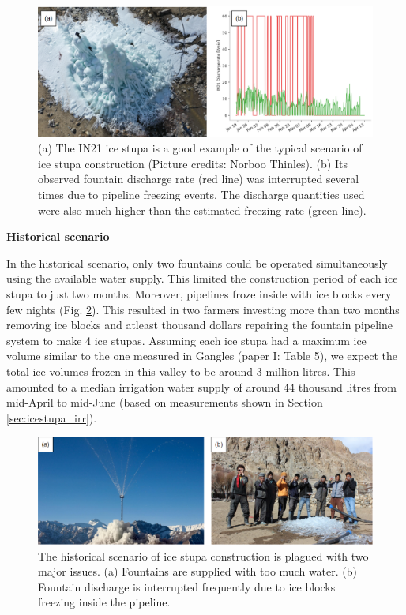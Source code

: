 \begin{figure}[htb]
	\includegraphics[width=\textwidth]{figs/gangles_data}

  \caption{(a) The IN21 ice stupa is a good example of the typical scenario of ice stupa construction (Picture
  credits: Norboo Thinles). (b) Its observed fountain discharge rate (red line) was interrupted several times
  due to pipeline freezing events. The discharge quantities used were also much higher than the estimated
  freezing rate (green line). }

	\label{fig:gangles_data}
\end{figure}

\textbf{Historical scenario}

In the historical scenario, only two fountains could be operated simultaneously using the available water
supply. This limited the construction period of each ice stupa to just two months. Moreover, pipelines froze
inside with ice blocks every few nights (Fig. \ref{fig:issues}). This resulted in two farmers investing more
than two months removing ice blocks and atleast thousand dollars repairing the fountain pipeline system to make
4 ice stupas. Assuming each ice stupa had a maximum ice volume similar to the one measured in Gangles (paper I:
Table 5), we expect the total ice volumes frozen in this valley to be around 3 million litres. This amounted to
a median irrigation water supply of around 44 thousand litres from mid-April to mid-June (based on measurements
shown in Section \ref{sec:icestupa_irr}).   

\begin{figure}[htb]
	\includegraphics[width=\textwidth]{figs/construction_issues}

  \caption{The historical scenario of ice stupa construction is plagued with two major issues. (a) Fountains are
  supplied with too much water. (b) Fountain discharge is interrupted frequently due to ice blocks freezing
  inside the pipeline.}

	\label{fig:issues}
\end{figure}

